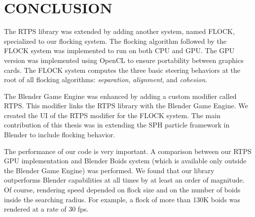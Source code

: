 \chapter{CONCLUSION}\label{conclusionChapter}


The RTPS library was extended by adding another system, named FLOCK, specialized to our flocking system. The flocking algorithm followed by the FLOCK system was implemented to run on both CPU and GPU. The GPU version was implemented using OpenCL to ensure portability between graphics cards. The FLOCK system computes the three basic steering behaviors at the root of all flocking algorithms: \textit{separation}, \textit{alignment}, and \textit{cohesion}. 

The Blender Game Engine was enhanced by adding a custom modifier called RTPS. This modifier links the RTPS library with the Blender Game Engine. We created the UI of the RTPS modifier for the FLOCK system. The main contribution of this thesis was in extending the SPH particle framework in Blender to include flocking behavior.   

The performance of our code is very important. A comparison between our RTPS GPU implementation and Blender Boids system (which is available only outside the Blender Game Engine) was performed. We found that our library outperforms Blender capabilities at all times by at least an order of magnitude. Of course, rendering speed depended on flock size and on the number of boids inside the searching radius. For example, a flock of more than 130K boids was rendered at a rate of 30 fps.

